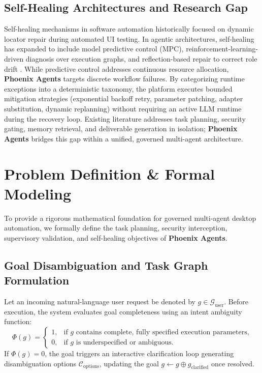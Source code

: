 \documentclass[conference]{IEEEtran}
\begin{document}
\subsection{Self-Healing Architectures and Research Gap}
Self-healing mechanisms in software automation historically focused on dynamic locator repair during automated UI testing. In agentic architectures, self-healing has expanded to include model predictive control (MPC), reinforcement-learning-driven diagnosis over execution graphs, and reflection-based repair to correct role drift \cite{ju2025, wang2026, patel2026isiber}. While predictive control addresses continuous resource allocation, \textbf{Phoenix Agents} targets discrete workflow failures. By categorizing runtime exceptions into a deterministic taxonomy, the platform executes bounded mitigation strategies (exponential backoff retry, parameter patching, adapter substitution, dynamic replanning) without requiring an active LLM runtime during the recovery loop. Existing literature addresses task planning, security gating, memory retrieval, and deliverable generation in isolation; \textbf{Phoenix Agents} bridges this gap within a unified, governed multi-agent architecture.

\section{Problem Definition \& Formal Modeling}
\label{sec:problem_definition}

To provide a rigorous mathematical foundation for governed multi-agent desktop automation, we formally define the task planning, security interception, supervisory validation, and self-healing objectives of \textbf{Phoenix Agents}.

\subsection{Goal Disambiguation and Task Graph Formulation}
Let an incoming natural-language user request be denoted by $g \in \mathcal{G}_{\text{user}}$. Before execution, the system evaluates goal completeness using an intent ambiguity function:
\begin{equation}
\Phi(g) = \begin{cases}
1, & \text{if } g \text{ contains complete, fully specified execution parameters,} \\
0, & \text{if } g \text{ is underspecified or ambiguous.}
\end{cases}
\end{equation}
If $\Phi(g) = 0$, the goal triggers an interactive clarification loop generating disambiguation options $\mathcal{C}_{\text{options}}$, updating the goal $g \leftarrow g \oplus g_{\text{clarified}}$ once resolved.
\end{document}
